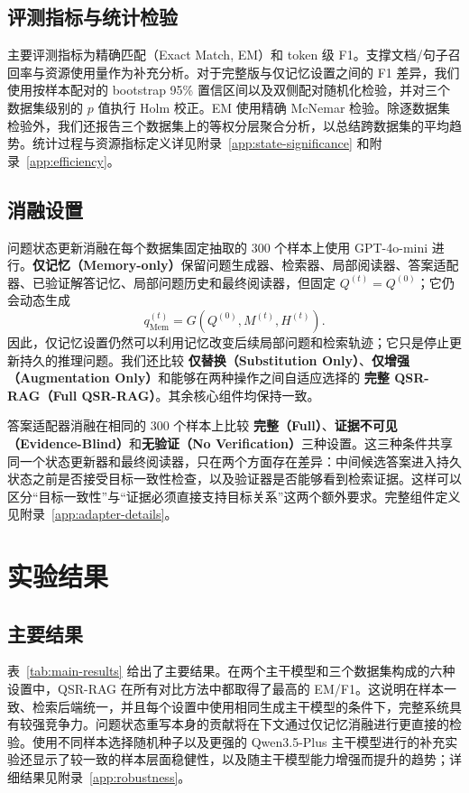 \documentclass[11pt]{article}
\begin{document}
	\subsection{评测指标与统计检验}
	主要评测指标为精确匹配（Exact Match, EM）和 token 级 F1。支撑文档/句子召回率与资源使用量作为补充分析。对于完整版与仅记忆设置之间的 F1 差异，我们使用按样本配对的 bootstrap 95\% 置信区间以及双侧配对随机化检验，并对三个数据集级别的 $p$ 值执行 Holm 校正。EM 使用精确 McNemar 检验。除逐数据集检验外，我们还报告三个数据集上的等权分层聚合分析，以总结跨数据集的平均趋势。统计过程与资源指标定义详见附录~\ref{app:state-significance} 和附录~\ref{app:efficiency}。

	\subsection{消融设置}
	\label{sec:ablation-setup}
	问题状态更新消融在每个数据集固定抽取的 300 个样本上使用 GPT-4o-mini 进行。\textbf{仅记忆（Memory-only）}保留问题生成器、检索器、局部阅读器、答案适配器、已验证解答记忆、局部问题历史和最终阅读器，但固定 $Q^{(t)}=Q^{(0)}$；它仍会动态生成
	\begin{equation}
		q^{(t)}_{\mathrm{Mem}}=G\!\left(Q^{(0)},M^{(t)},H^{(t)}\right).
		\label{eq:memory-only}
	\end{equation}
	因此，仅记忆设置仍然可以利用记忆改变后续局部问题和检索轨迹；它只是停止更新持久的推理问题。我们还比较 \textbf{仅替换（Substitution Only）}、\textbf{仅增强（Augmentation Only）}和能够在两种操作之间自适应选择的 \textbf{完整 QSR-RAG（Full QSR-RAG）}。其余核心组件均保持一致。

	答案适配器消融在相同的 300 个样本上比较 \textbf{完整（Full）}、\textbf{证据不可见（Evidence-Blind）}和\textbf{无验证（No Verification）}三种设置。这三种条件共享同一个状态更新器和最终阅读器，只在两个方面存在差异：中间候选答案进入持久状态之前是否接受目标一致性检查，以及验证器是否能够看到检索证据。这样可以区分“目标一致性”与“证据必须直接支持目标关系”这两个额外要求。完整组件定义见附录~\ref{app:adapter-details}。

	\section{实验结果}

	\subsection{主要结果}
	表~\ref{tab:main-results} 给出了主要结果。在两个主干模型和三个数据集构成的六种设置中，QSR-RAG 在所有对比方法中都取得了最高的 EM/F1。这说明在样本一致、检索后端统一，并且每个设置中使用相同生成主干模型的条件下，完整系统具有较强竞争力。问题状态重写本身的贡献将在下文通过仅记忆消融进行更直接的检验。使用不同样本选择随机种子以及更强的 Qwen3.5-Plus 主干模型进行的补充实验还显示了较一致的样本层面稳健性，以及随主干模型能力增强而提升的趋势；详细结果见附录~\ref{app:robustness}。
\end{document}
